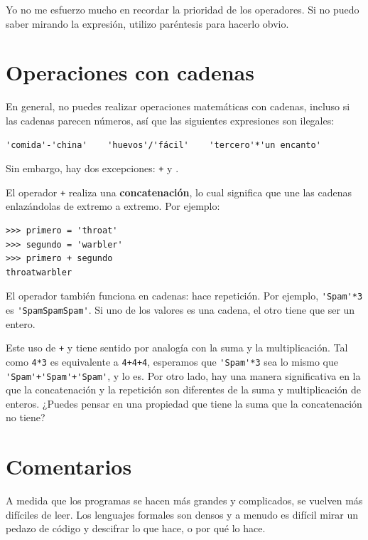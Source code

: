 \documentclass[10pt]{book}
\begin{document}
Yo no me esfuerzo mucho en recordar la prioridad de los
operadores. Si no puedo saber mirando la expresión, utilizo
paréntesis para hacerlo obvio.


\section{Operaciones con cadenas}

En general, no puedes realizar operaciones matemáticas con cadenas, incluso
si las cadenas parecen números, así que las siguientes expresiones son ilegales:

\begin{verbatim}
'comida'-'china'    'huevos'/'fácil'    'tercero'*'un encanto'
\end{verbatim}
%
Sin embargo, hay dos excepciones: {\tt +} y {\tt *}.

El operador {\tt +} realiza una {\bf concatenación}, lo cual significa que
une las cadenas enlazándolas de extremo a extremo.  Por ejemplo:

\begin{verbatim}
>>> primero = 'throat'
>>> segundo = 'warbler'
>>> primero + segundo
throatwarbler
\end{verbatim}
%
El operador {\tt *} también funciona en cadenas: hace repetición.
Por ejemplo, \verb"'Spam'*3" es \verb"'SpamSpamSpam'".  Si uno de los
valores es una cadena, el otro tiene que ser un entero.

Este uso de {\tt +} y {\tt *} tiene sentido por
analogía con la suma y la multiplicación.  Tal como {\tt 4*3} es
equivalente a {\tt 4+4+4}, esperamos que \verb"'Spam'*3" sea lo mismo que
\verb"'Spam'+'Spam'+'Spam'", y lo es.  Por otro lado, hay una
manera significativa en la que la concatenación y la repetición son
diferentes de la suma y multiplicación de enteros.
¿Puedes pensar en una propiedad que tiene la suma
que la concatenación no tiene?


\section{Comentarios}

A medida que los programas se hacen más grandes y complicados, se vuelven más difíciles
de leer.  Los lenguajes formales son densos y a menudo es difícil
mirar un pedazo de código y descifrar lo que hace, o por qué lo hace.
\end{document}

